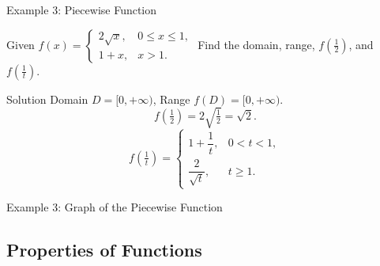 \documentclass[aspectratio=169,10pt]{beamer}
\begin{document}
\begin{frame}{Example 3: Piecewise Function}
  \begin{example}
    Given $f(x)=\begin{cases}2\sqrt{x}, & 0\le x\le 1,\\ 1+x, & x>1.\end{cases}$
    \pause
    Find the domain, range, $f(\frac12)$, and $f(\frac1t)$.
  \end{example}
  \pause
  \begin{block}{Solution}
    Domain $D=[0,+\infty)$, \quad Range $f(D)=[0,+\infty)$.
    \pause
    \[
      f(\tfrac12) = 2\sqrt{\tfrac12} = \sqrt{2}.
    \]
    \pause
    \[
      f(\tfrac1t) =
      \begin{cases}
        1+\dfrac{1}{t}, & 0<t<1,\\[8pt]
        \dfrac{2}{\sqrt{t}},   & t\ge 1.
      \end{cases}
    \]
  \end{block}
\end{frame}

\begin{frame}{Example 3: Graph of the Piecewise Function}
  \begin{center}
  \end{center}
\end{frame}

\subsection{Properties of Functions}
\end{document}
